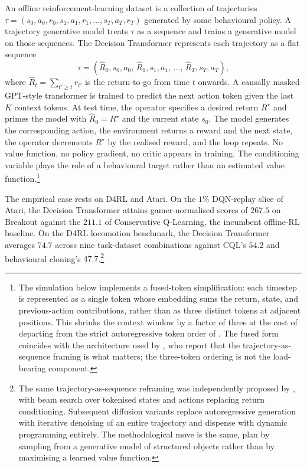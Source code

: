 An offline reinforcement-learning dataset is a collection of trajectories $\tau = (s_0, a_0, r_0, s_1, a_1, r_1, \dots, s_T, a_T, r_T)$ generated by some behavioural policy. A trajectory generative model treats $\tau$ as a sequence and trains a generative model on those sequences. The \citet{Chen2021DT} Decision Transformer represents each trajectory as a flat sequence
\begin{equation}
\tau = (\widehat R_0, s_0, a_0,\, \widehat R_1, s_1, a_1,\, \dots,\, \widehat R_T, s_T, a_T),
\label{eq:dt_sequence}
\end{equation}
where $\widehat R_t = \sum_{t' \ge t} r_{t'}$ is the return-to-go from time $t$ onwards. A causally masked GPT-style transformer is trained to predict the next action token given the last $K$ context tokens. At test time, the operator specifies a desired return $R^\star$ and primes the model with $\widehat R_0 = R^\star$ and the current state $s_0$. The model generates the corresponding action, the environment returns a reward and the next state, the operator decrements $R^\star$ by the realised reward, and the loop repeats. No value function, no policy gradient, no critic appears in training. The conditioning variable plays the role of a behavioural target rather than an estimated value function.\footnote{The simulation below implements a fused-token simplification: each timestep is represented as a single token whose embedding sums the return, state, and previous-action contributions, rather than as three distinct tokens at adjacent positions. This shrinks the context window by a factor of three at the cost of departing from the strict autoregressive token order of \citet{Chen2021DT}. The fused form coincides with the architecture used by \citet{Emmons2022}, who report that the trajectory-as-sequence framing is what matters; the three-token ordering is not the load-bearing component.}

The empirical case rests on D4RL and Atari. On the $1\%$ DQN-replay slice of Atari, the Decision Transformer attains gamer-normalised scores of $267.5$ on Breakout against the $211.1$ of Conservative Q-Learning, the incumbent offline-RL baseline. On the D4RL locomotion benchmark, the Decision Transformer averages $74.7$ across nine task-dataset combinations against CQL's $54.2$ and behavioural cloning's $47.7$.\footnote{The same trajectory-as-sequence reframing was independently proposed by \citet{Janner2021TT}, with beam search over tokenised states and actions replacing return conditioning. Subsequent diffusion variants \citep{Janner2022diffuser,Ajay2023} replace autoregressive generation with iterative denoising of an entire trajectory and dispense with dynamic programming entirely. The methodological move is the same, plan by sampling from a generative model of structured objects rather than by maximising a learned value function.}

